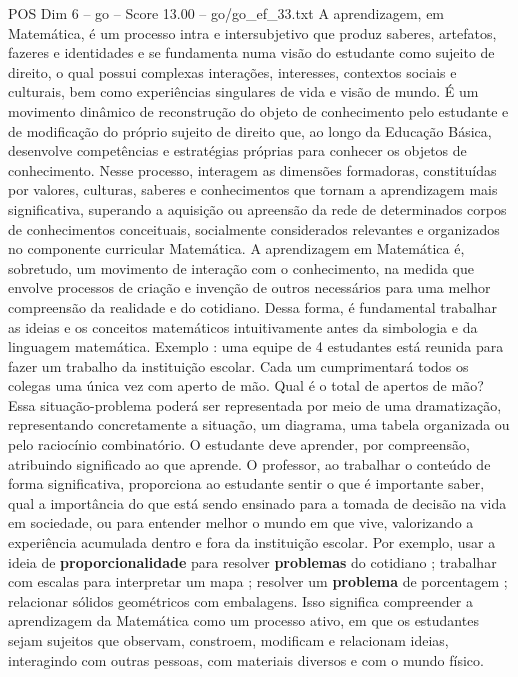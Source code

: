 \begin{textsample}{POS Dim 6 – go – Score 13.00 – go/go\_ef\_33.txt}  \label{ex:f6_pos_112}
A aprendizagem, em Matemática, é um processo intra e intersubjetivo que produz saberes, artefatos, fazeres e identidades e se fundamenta numa visão do estudante como sujeito de direito, o qual possui complexas interações, interesses, contextos sociais e culturais, bem como experiências singulares de vida e visão de mundo.
É um movimento dinâmico de reconstrução do objeto de conhecimento pelo estudante e de modificação do próprio sujeito de direito que, ao longo da Educação Básica, desenvolve competências e estratégias próprias para conhecer os objetos de conhecimento.
Nesse processo, interagem as dimensões formadoras, constituídas por valores, culturas, saberes e conhecimentos que tornam a aprendizagem mais significativa, superando a aquisição ou apreensão da rede de determinados corpos de conhecimentos conceituais, socialmente considerados relevantes e organizados no componente curricular Matemática.
A aprendizagem em Matemática é, sobretudo, um movimento de interação com o conhecimento, na medida que envolve processos de criação e invenção de outros necessários para uma melhor compreensão da realidade e do cotidiano.
Dessa forma, é fundamental trabalhar as ideias e os conceitos matemáticos intuitivamente antes da simbologia e da linguagem matemática.
Exemplo : uma equipe de 4 estudantes está reunida para fazer um trabalho da instituição escolar.
Cada um cumprimentará todos os colegas uma única vez com aperto de mão.
Qual é o total de apertos de mão?
Essa situação-problema poderá ser representada por meio de uma dramatização, representando concretamente a situação, um diagrama, uma tabela organizada ou pelo raciocínio combinatório.
O estudante deve aprender, por compreensão, atribuindo significado ao que aprende.
O professor, ao trabalhar o conteúdo de forma significativa, proporciona ao estudante sentir o que é importante saber, qual a importância do que está sendo ensinado para a tomada de decisão na vida em sociedade, ou para entender melhor o mundo em que vive, valorizando a experiência acumulada dentro e fora da instituição escolar.
Por exemplo, usar a ideia de \textbf{proporcionalidade} para resolver \textbf{problemas} do cotidiano ; trabalhar com escalas para interpretar um mapa ; resolver um \textbf{problema} de porcentagem ; relacionar sólidos geométricos com embalagens.
Isso significa compreender a aprendizagem da Matemática como um processo ativo, em que os estudantes sejam sujeitos que observam, constroem, modificam e relacionam ideias, interagindo com outras pessoas, com materiais diversos e com o mundo físico.

\end{textsample}
